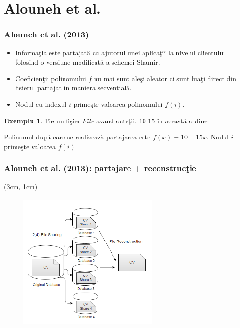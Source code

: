 \documentclass{beamer}
\theoremstyle{definition}
\newtheorem{my_example}[theorem]{Exemplu}
\begin{document}
\section{Alouneh et al.}
\begin{frame}
    \frametitle{Alouneh et al. (2013)}
    \begin{itemize}
        \item Informa\c{t}ia este partajat\u{a} cu ajutorul unei aplica\c{t}ii la nivelul clientului folosind o versiune modificat\u{a} a schemei Shamir.
        \pause
        \item Coeficien\c{t}ii polinomului $f$ nu mai sunt ale\c{s}i aleator ci sunt lua\c{t}i direct din fisierul partajat in maniera secvential\u{a}.
        \pause
        \item Nodul cu indexul $i$ prime\c{s}te valoarea polinomului $f(i)$.
    \end{itemize} 
    \pause
    \begin{my_example}
        Fie un fi\c{s}ier $File$ avand octe\c{t}ii: $10$ $15$ \^{i}n aceast\u{a} ordine.

        Polinomul dup\u{a} care se realizeaz\u{a} partajarea este $f(x) = 10 + 15x$.
        Nodul $i$ prime\c{s}te valoarea $f(i)$
    \end{my_example}
\end{frame}
\begin{frame}
    \frametitle{Alouneh et al. (2013): partajare + reconstruc\c{t}ie}
     \begin{textblock*}{4cm}(3cm, 1cm)
        \begin{figure}
            \includegraphics[width=7cm,height=7cm,keepaspectratio]{img/results/sharing.png}
       \end{figure}
    \end{textblock*}
\end{frame}
\end{document}
